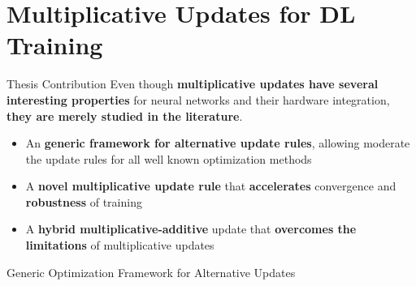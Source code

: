 \section{Multiplicative Updates for DL Training}

\begin{frame}{Thesis Contribution}
  Even though \textbf{multiplicative updates have several interesting properties}
  for neural networks and their hardware integration, \textbf{they are merely studied in
  the literature}.
  
  \begin{itemize}
    \item An \textbf{generic framework for alternative update rules}, allowing moderate
      the update rules for all well known optimization methods
    \item A \textbf{novel multiplicative update rule} that \textbf{accelerates} convergence and\textbf{ robustness} of training
    \item A \textbf{hybrid multiplicative-additive} update that \textbf{overcomes the limitations} of multiplicative updates
  \end{itemize}	
\end{frame}

\begin{frame}{Generic Optimization Framework for Alternative Updates}
\begin{algorithm}[H]
    \caption{Generic Optimization Framework for Alternative Updates (GOFAU) \label{alg:optim}}    
\end{algorithm}
\end{frame}

